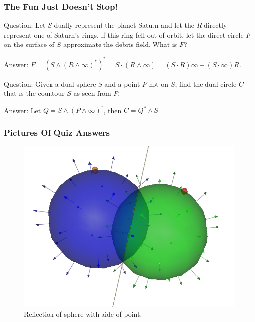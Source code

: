 \documentclass{beamer}
\newcommand{\nvai}{\infty}
\begin{document}
\begin{frame}
\frametitle{The Fun Just Doesn't Stop!}
\pause
\alert{Question}: Let $S$ \alert{dually} represent the planet Saturn and let the $R$ \alert{directly} represent
one of Saturn's rings.  If this ring fell out of orbit, let the \alert{direct} circle $F$ on the surface of $S$ approximate
the debris field.  What is $F$?\pause

\alert{Answer}: $F = (S\wedge (R\wedge\nvai)^*)^* = S\cdot (R\wedge\nvai) = (S\cdot R)\nvai - (S\cdot\nvai)R$.\pause

\alert{Question}: Given a \alert{dual} sphere $S$ and a point $P$ not on $S$, find
the dual circle $C$ that is the countour $S$ as seen from $P$.\pause

\alert{Answer}: Let $Q = S\wedge(P\wedge\nvai)^*$, then $C = Q^*\wedge S$.

%

\end{frame}

\begin{frame}
\frametitle{Pictures Of Quiz Answers}
\begin{figure}
\centering
\includegraphics[scale=0.4]{SphereReflectionAboutPlane}
\caption{Reflection of sphere with aide of point.}
\end{figure}
\end{frame}
\end{document}
